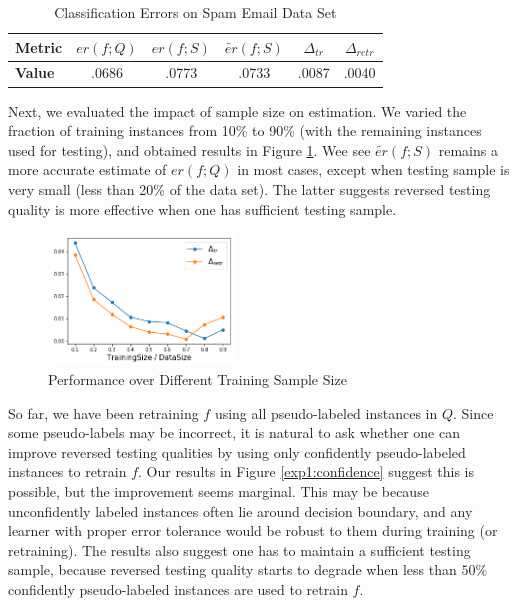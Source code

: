\begin{table}[h]
\renewcommand{\arraystretch}{1.5} 
\caption{Classification Errors on Spam Email Data Set}
\centering
\begin{tabular}{l|ccccc} \hline 
\bf Metric & \bf $er(f; Q)$ & \bf $er(f; S)$ & \bf 
$\tilde{er}(f; S)$ & \bf $\Delta_{tr}$ & \bf 
$\Delta_{retr}$ \\ \hline 
\bf Value & .0686 & .0773 & .0733 & .0087 & .0040 \\ \hline 
\end{tabular}
\label{exp1:classificationerror}
\end{table}

Next, we evaluated the impact of sample size on 
estimation. We varied the fraction of training 
instances from 10\% to 90\% (with the remaining 
instances used for testing), and obtained results 
in Figure \ref{exp1:samplesize}. 
Wee see $\tilde{er}(f; S)$ remains a more accurate 
estimate of $er(f; Q)$ in most cases, except when 
testing sample is very small (less than 20\% of the 
data set). The latter suggests reversed testing 
quality is more effective when one has sufficient 
testing sample. 

\begin{figure}[h]
\centering
\includegraphics[width=5cm,height=3.5cm]{exp1_samplesize.png}
\vspace{-10pt}
\caption{Performance over Different Training Sample Size}
\label{exp1:samplesize}
\end{figure}

So far, we have been retraining $f$ using all pseudo-labeled 
instances in $Q$. Since some pseudo-labels may be incorrect, 
it is natural to ask whether one can improve reversed 
testing qualities by using only confidently pseudo-labeled 
instances to retrain $f$. Our results in 
Figure \ref{exp1:confidence} suggest this is possible, 
but the improvement seems marginal. 
This may be because unconfidently labeled instances often 
lie around decision boundary, and any learner with proper 
error tolerance would be robust to them during training 
(or retraining). 
The results also suggest one has to maintain a sufficient 
testing sample, because reversed testing quality starts 
to degrade when less than $50\%$ confidently pseudo-labeled
instances are used to retrain $f$. 


